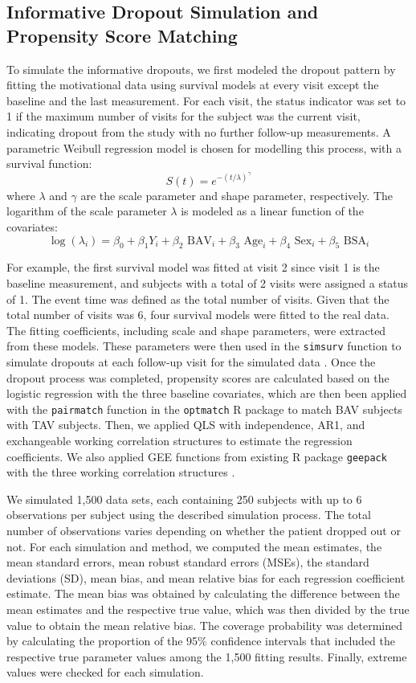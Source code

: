 \documentclass[
]{aft}
\begin{document}
\subsection{Informative Dropout Simulation and Propensity Score
Matching}\label{informative-dropout-simulation-and-propensity-score-matching}

To simulate the informative dropouts, we first modeled the dropout
pattern by fitting the motivational data using survival models at every
visit except the baseline and the last measurement. For each visit, the
status indicator was set to 1 if the maximum number of visits for the
subject was the current visit, indicating dropout from the study with no
further follow-up measurements. A parametric Weibull regression model is
chosen for modelling this process, with a survival function: \[
S(t) = e^{-(t/\lambda)^{\gamma}}
\] where \(\lambda\) and \(\gamma\) are the scale parameter and shape
parameter, respectively. The logarithm of the scale parameter
\(\lambda\) is modeled as a linear function of the covariates: \[
\log(\lambda_i) = \beta_0 + \beta_1 Y_i +\beta_2 \text{ BAV}_i + \beta_3 \text{ Age}_i +\beta_4 \text{ Sex}_i + \beta_5 \text{ BSA}_i
\]

For example, the first survival model was fitted at visit 2 since visit
1 is the baseline measurement, and subjects with a total of 2 visits
were assigned a status of 1. The event time was defined as the total
number of visits. Given that the total number of visits was 6, four
survival models were fitted to the real data. The fitting coefficients,
including scale and shape parameters, were extracted from these models.
These parameters were then used in the \texttt{simsurv} function to
simulate dropouts at each follow-up visit for the simulated data
\citep{simsurv20}. Once the dropout process was completed, propensity
scores are calculated based on the logistic regression with the three
baseline covariates, which are then been applied with the
\texttt{pairmatch} function in the \texttt{optmatch} R package to match
BAV subjects with TAV subjects. Then, we applied QLS with independence,
AR1, and exchangeable working correlation structures to estimate the
regression coefficients. We also applied GEE functions from existing R
package \texttt{geepack} with the three working correlation structures
\citep{Hojsgaard2006}.

We simulated 1,500 data sets, each containing 250 subjects with up to 6
observations per subject using the described simulation process. The
total number of observations varies depending on whether the patient
dropped out or not. For each simulation and method, we computed the mean
estimates, the mean standard errors, mean robust standard errors (MSEs),
the standard deviations (SD), mean bias, and mean relative bias for each
regression coefficient estimate. The mean bias was obtained by
calculating the difference between the mean estimates and the respective
true value, which was then divided by the true value to obtain the mean
relative bias. The coverage probability was determined by calculating
the proportion of the 95\% confidence intervals that included the
respective true parameter values among the 1,500 fitting results.
Finally, extreme values were checked for each simulation.
\end{document}

